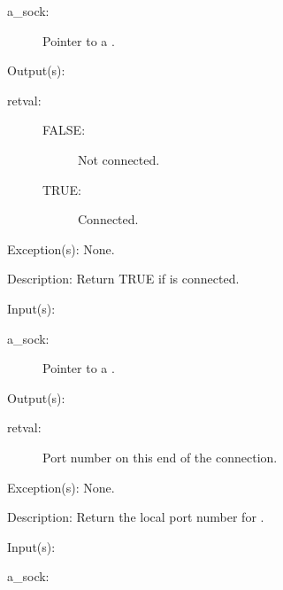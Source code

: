 \begin{capi}
\begin{capilist}
		\begin{description}\item[]
		\item[a\_sock: ]
			Pointer to a .
		\end{description}
	\item[Output(s): ]
		\begin{description}\item[]
		\item[retval: ]
			\begin{description}\item[]
			\item[FALSE: ]
				Not connected.
			\item[TRUE: ]
				Connected.
			\end{description}
		\end{description}
	\item[Exception(s): ] None.
	\item[Description: ]
		Return TRUE if  is connected.
	\end{capilist}
\label{sock_port_get}
	\begin{capilist}
	\item[Input(s): ]
		\begin{description}\item[]
		\item[a\_sock: ]
			Pointer to a .
		\end{description}
	\item[Output(s): ]
		\begin{description}\item[]
		\item[retval: ]
			Port number on this end of the connection.
		\end{description}
	\item[Exception(s): ] None.
	\item[Description: ]
		Return the local port number for .
	\end{capilist}
\label{sock_connect}
	\begin{capilist}
	\item[Input(s): ]
		\begin{description}\item[]
		\item[a\_sock: ]

\end{description}
\end{capilist}
\end{capi}
